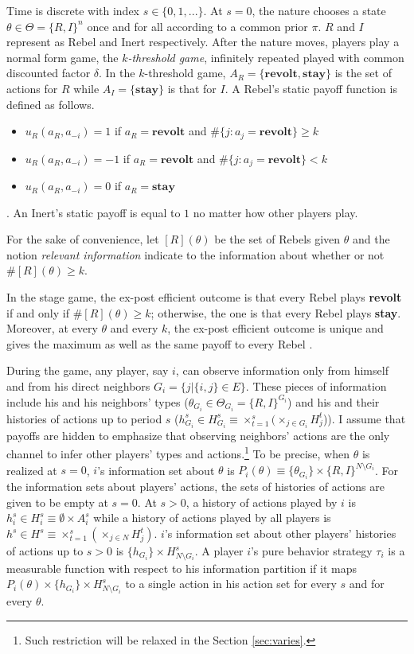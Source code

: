\documentclass[12pt,letter]{article}
\theoremstyle{definition}
\theoremstyle{remark}
\theoremstyle{claim}
\begin{document}
Time is discrete with index $s\in\{0,1,...\}$. At $s=0$, the nature chooses a state $\theta\in \Theta=\{R,I\}^n$ once and for all according to a common prior $\pi$. $R$ and $I$ represent as Rebel and Inert respectively. After the nature moves, players play a normal form game, the \textit{$k$-threshold game}, infinitely repeated played with common discounted factor $\delta$. In the $k$-threshold game, $A_R=\{\textbf{revolt}, \textbf{stay}\}$ is the set of actions for $R$ while $A_I=\{\textbf{stay}\}$ is that for $I$. A Rebel's static payoff function is defined as follows. 
\begin{itemize}
\item $u_{R}(a_{R},a_{-i})=1$ if $a_{R}=\textbf{revolt}$ and $\#\{j:a_{j}=\textbf{revolt}\}\geq k$
\item $u_{R}(a_{R},a_{-i})=-1$ if $a_{R}=\textbf{revolt}$ and $\#\{j:a_{j}=\textbf{revolt}\}< k$
\item $u_{R}(a_{R},a_{-i})=0$ if $a_{R}=\textbf{stay}$
\end{itemize}
. An Inert's static payoff is equal to $1$ no matter how other players play. 

For the sake of convenience, let $[R](\theta)$ be the set of Rebels given $\theta$ and the notion \textit{relevant information} indicate to the information about whether or not $\#[R](\theta)\geq k$.

In the stage game, the ex-post efficient outcome is that every Rebel plays \textbf{revolt} if and only if $\#[R](\theta)\geq k$; otherwise, the one is that every Rebel plays \textbf{stay}. Moreover, at every $\theta$ and every $k$, the ex-post efficient outcome is unique and gives the maximum as well as the same payoff to every Rebel . 

During the game, any player, say $i$, can observe information only from himself and from his direct neighbors $G_i=\{j|\{i,j\}\in E\}$. These pieces of information include his and his neighbors' types ($\theta_{G_i}\in \Theta_{G_i}=\{R,I\}^{G_i}$) and his and their histories of actions up to period $s$ ($h^s_{G_i}\in H^s_{G_i}\equiv\times^s_{t=1}(\times_{j\in G_i}H^t_j$)). I assume that payoffs are hidden to emphasize that observing neighbors' actions are the only channel to infer other players' types and actions.\footnote{Such restriction will be relaxed in the Section \ref{sec:varies}.} 
To be precise, when $\theta$ is realized at $s=0$, $i$'s information set about $\theta$ is $P_{i}(\theta)\equiv\{\theta_{G_i}\}\times \{R,I\}^{N\setminus G_i}$. For the information sets about players' actions, the sets of histories of actions are given to be empty at $s=0$. At $s>0$, a history of actions played by $i$ is $h^s_i\in H^s_{i}\equiv\emptyset\times A^s_i$ while a history of actions played by all players is $h^s\in H^s\equiv\times^s_{t=1}(\times_{j\in N}H^t_j)$. $i$'s information set about other players' histories of actions up to $s>0$ is $\{h_{G_i}\}\times H^s_{N\setminus G_i}$. A player $i$'s pure behavior strategy $\tau_{i}$ is a measurable function with respect to his information partition if it maps $P_i(\theta)\times \{h_{G_i}\}\times H^s_{N\setminus G_i}$ to a single action in his action set for every $s$ and for every $\theta$. 
\end{document}
